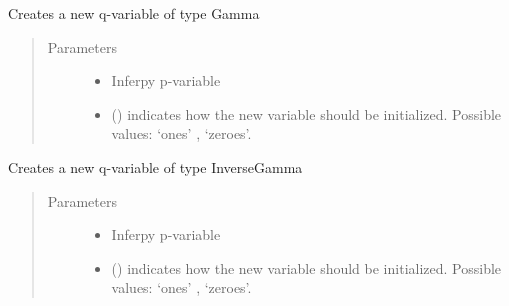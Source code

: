 \documentclass[letterpaper,10pt,english]{sphinxmanual}
\begin{document}
\begin{fulllineitems}
\begin{fulllineitems}
\label{\detokenize{modules/inferpy.inferences:inferpy.inferences.qmodel.Qmodel.Gamma}}
Creates a new q-variable of type Gamma
\begin{quote}\begin{description}
\item[{Parameters}] \leavevmode\begin{itemize}
\item {} 
 \textendash{} Inferpy p-variable

\item {} 
 () \textendash{} indicates how the new variable should be initialized. Possible values: ‘ones’ , ‘zeroes’.

\end{itemize}

\end{description}\end{quote}

\end{fulllineitems}


\begin{fulllineitems}
\label{\detokenize{modules/inferpy.inferences:inferpy.inferences.qmodel.Qmodel.InverseGamma}}
Creates a new q-variable of type InverseGamma
\begin{quote}\begin{description}
\item[{Parameters}] \leavevmode\begin{itemize}
\item {} 
 \textendash{} Inferpy p-variable

\item {} 
 () \textendash{} indicates how the new variable should be initialized. Possible values: ‘ones’ , ‘zeroes’.

\end{itemize}

\end{description}\end{quote}


\end{fulllineitems}
\end{fulllineitems}
\end{document}
